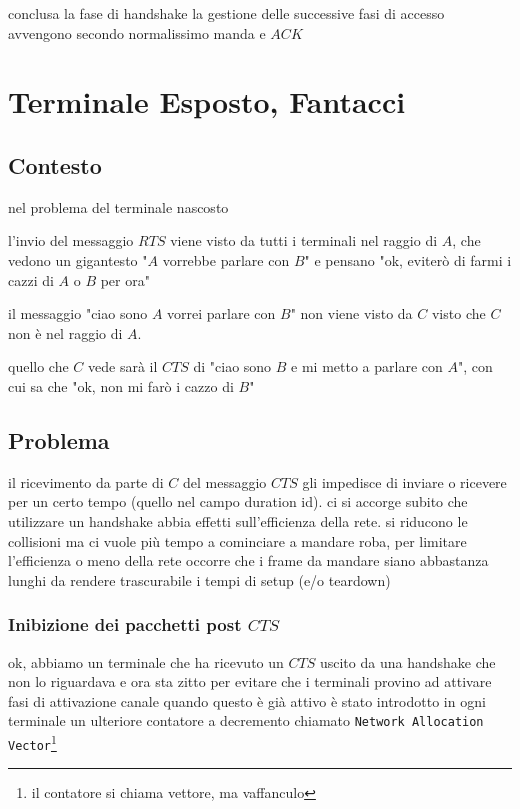 \documentclass[11pt]{article}
\begin{document}
conclusa la fase di handshake la gestione delle successive fasi di accesso avvengono secondo normalissimo manda e \(ACK\)    

\section{Terminale Esposto, Fantacci}
\label{sec:org710b3cd}
\subsection{Contesto}
\label{sec:org428ee5f}
nel problema del terminale nascosto

l'invio del messaggio \(RTS\) viene visto da tutti i terminali nel raggio di \(A\), che vedono un gigantesto "\(A\) vorrebbe parlare con \(B\)" e pensano "ok, eviterò di farmi i cazzi di \(A\) o \(B\) per ora"

il messaggio "ciao sono \(A\) vorrei parlare con \(B\)" non viene visto da \(C\) visto che \(C\) non è nel raggio di \(A\).

quello che \(C\) vede sarà il \(CTS\) di "ciao sono \(B\) e mi metto a parlare con \(A\)", con cui sa che "ok, non mi farò i cazzo di \(B\)"

\subsection{Problema}
\label{sec:orgaa76c17}
il ricevimento da parte di \(C\) del messaggio \(CTS\) gli impedisce di inviare o ricevere per un certo tempo (quello nel campo duration id).
ci si accorge subito che utilizzare un handshake abbia effetti sull'efficienza della rete.
si riducono le collisioni ma ci vuole più tempo a cominciare a mandare roba, per limitare l'efficienza o meno della rete occorre che i frame da mandare siano abbastanza lunghi da rendere trascurabile i tempi di setup (e/o teardown)

\subsubsection{Inibizione dei pacchetti post \(CTS\)}
\label{sec:org4c11df8}
ok, abbiamo un terminale che ha ricevuto un \(CTS\) uscito da una handshake che non lo riguardava e ora sta zitto
per evitare che i terminali provino ad attivare fasi di attivazione canale quando questo è già attivo è stato introdotto in ogni terminale un ulteriore contatore a decremento chiamato \texttt{Network Allocation Vector}\footnote{il contatore si chiama vettore, ma vaffanculo}
\end{document}
